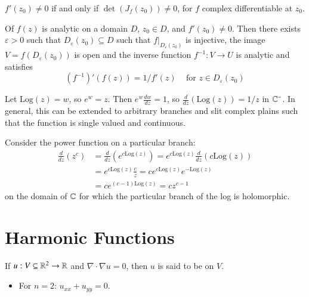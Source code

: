\begin{theorem}
    $f'(z_0) \neq 0$ if and only if $\det(J_f(z_0)) \neq 0$, for $f$ complex differentiable at $z_0$. 
\end{theorem}

\begin{theorem}\label{thm:invfunc}
    Of $f(z)$ is analytic on a domain $D$, $z_0 \in D$, and $f'(z_0) \neq 0$. Then there exists $\varepsilon > 0$ such that $D_{\varepsilon}(z_0) \subseteq D$ such that $f\vert_{D_{\varepsilon}(z_0)}$ is injective, the image $V = f(D_{\varepsilon}(z_0))$ is open and the inverse function $f^{-1}:V\rightarrow U$ is analytic and satisfies \begin{equation*}
        (f^{-1})'(f(z)) = 1/f'(z)\;\;\;\text{ for } z \in D_{\varepsilon}(z_0)
    \end{equation*}
\end{theorem}

\begin{example}
    Let $\text{Log}(z) = w$, so $e^w = z$. Then $e^w\frac{dw}{dz} = 1$, so $\frac{d}{dz}(\text{Log}(z)) = 1/z$ in $\mathbb C^-$. In general, this can be extended to arbitrary branches and slit complex plains such that the function is single valued and continuous.
\end{example}

\begin{example}
    Consider the power function on a particular branch: \begin{align*}
        \frac{d}{dz}(z^c) &= \frac{d}{dz}(e^{c\text{Log}(z)}) = e^{c\text{Log}(z)}\frac{d}{dz}({c\text{Log}(z)}) \\
        &= e^{c\text{Log}(z)}\frac{c}{z} = ce^{c\text{Log}(z)}e^{-\text{Log}(z)} \\
        &= ce^{(c-1)\text{Log}(z)} = cz^{c-1}
    \end{align*}
    on the domain of $\mathbb C$ for which the particular branch of the log is holomorphic.
\end{example}




\section{Harmonic Functions}

\begin{definition}
    If $u:V\subseteq \mathbb R^2\rightarrow \mathbb R$ and $\nabla\cdot \nabla u = 0$, then $u$ is said to be  on $V$. \begin{itemize}
        \item For $n = 2$: $u_{xx} + u_{yy} = 0$.
    \end{itemize}
\end{definition}

